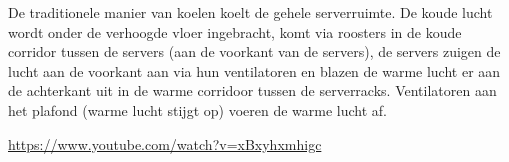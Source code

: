 De traditionele manier van koelen koelt de gehele serverruimte. De koude lucht wordt onder de verhoogde vloer ingebracht, komt via roosters in de koude corridor tussen de servers (aan de voorkant van de servers), de servers zuigen de lucht aan de voorkant aan via hun ventilatoren en blazen de warme lucht er aan de achterkant uit in de warme corridoor tussen de serverracks. Ventilatoren aan het plafond (warme lucht stijgt op) voeren de warme lucht af.

\url{https://www.youtube.com/watch?v=xBxyhxmhigc}

